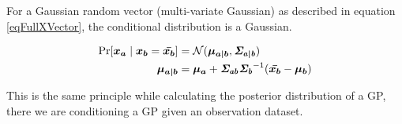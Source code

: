 For a Gaussian random vector (multi-variate Gaussian) as described in equation \ref{eqFullXVector}, the conditional distribution is a Gaussian. 

\begin{align}
    \Pr[\boldsymbol{x_a} \mid \boldsymbol{x_b} = \boldsymbol{\bar{x_b}}] & = \mathcal{N}(\boldsymbol{\mu_{a \mid b}}, \bm{\mathit{\Sigma_{a \mid b}}}) \\
    \boldsymbol{\mu_{a \mid b}} & = \boldsymbol{\mu_a} + \bm{\mathit{\Sigma_{ab}}}\bm{\mathit{\Sigma_b}}^{-1}(\boldsymbol{\bar{x_b}} - \boldsymbol{\mu_b})
\end{align}

This is the same principle while calculating the posterior distribution of a GP, there we are conditioning a GP given an observation dataset. 












